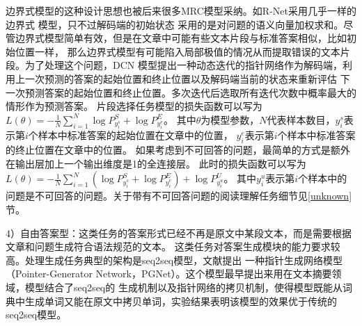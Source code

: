 边界式模型的这种设计思想也被后来很多MRC模型采纳。如R-Net采用几乎一样的边界式
模型，只不过解码端的初始状态
采用的是对问题的语义向量加权求和。尽管边界式模型简单有效，但是在文章中可能有些文本片段与标准答案相似，比如初始位置一样，
那么边界式模型有可能陷入局部极值的情况从而提取错误的文本片段。为了处理这个问题，DCN
模型提出一种动态迭代的指针网络作为解码端，利用上一次预测的答案的起始位置和终止位置以及解码端当前的状态来重新评估
下一次预测答案的起始位置和终止位置。多次迭代后选取所有迭代次数中概率最大的情形作为预测答案。
片段选择任务模型的损失函数可以写为
$L(\theta)=-\displaystyle\frac{1}{N}\sum_{i=1}^{N}\log P_{y_i^s}^S+\log P_{y_i^e}^E$。
其中$\theta$为模型参数，$N$代表样本数目，$y_i^s$表示第$i$个样本中标准答案的起始位置在文章中的位置，
$y_i^e$表示第$i$个样本中标准答案的终止位置在文章中的位置。
如果考虑到不可回答的问题，最简单的方式是额外在输出层加上一个输出维度是1的全连接层。
此时的损失函数可以写为
$L(\theta)=-\displaystyle\frac{1}{N}\sum_{i=1}^{N}(\log P_{y_i^s}^S+\log P_{y_i^e}^E)+\log P_{y_i^u}^U$。
其中$y_i^u$表示第$i$个样本中的问题是不可回答的问题。关于带有不可回答问题的阅读理解任务细节见\ref{unknown}节。

4）自由答案型：这类任务的答案形式已经不再是原文中某段文本，而是需要根据文章和问题生成符合语法规范的文本。
这类任务对答案生成模块的能力要求较高。处理生成任务典型的架构是seq2seq模型，文献\cite{PGNet}提出
一种指针生成网络模型（Pointer-Generator Network，PGNet）。这个模型最早提出来用在文本摘要领域，模型结合了seq2seq的
生成机制以及指针网络的拷贝机制，使得模型既能从词典中生成单词又能在原文中拷贝单词，实验结果表明该模型的效果优于传统的seq2seq模型。






